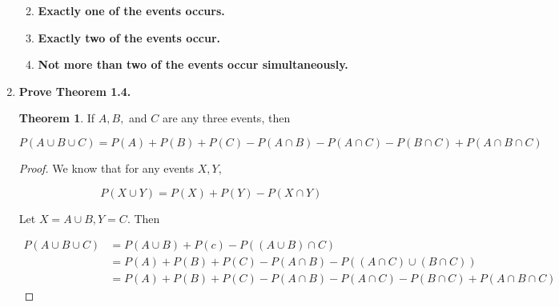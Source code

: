 \documentclass[10pt, oneside]{article}   	%
\theoremstyle{definition}
\newtheorem*{thm}{Theorem}
\begin{document}
\begin{enumerate}[label=1.\arabic*]
\begin{enumerate}
	
	\item  \begin{tcolorbox}[
	  colback=Cerulean!5!white,
	  colframe=Cerulean!75!black]
	\textbf{Exactly one of the events occurs.}
	\end{tcolorbox}
	
	
	\item  \begin{tcolorbox}[
	  colback=Cerulean!5!white,
	  colframe=Cerulean!75!black]
	\textbf{Exactly two of the events occur.}
	\end{tcolorbox}
	
	
	\item  \begin{tcolorbox}[
	  colback=Cerulean!5!white,
	  colframe=Cerulean!75!black]
	\textbf{Not more than two of the events occur simultaneously.}
	\end{tcolorbox}
	
	\end{enumerate}

\item  \begin{tcolorbox}[
  colback=Cerulean!5!white,
  colframe=Cerulean!75!black]
\textbf{Prove Theorem 1.4.}
\end{tcolorbox}

\begin{thm}
If $A, B,$ and $C$ are any three events, then

\[ P(A \cup B \cup C) = P(A) + P(B) + P(C) - P(A \cap B) - P(A \cap C) - P(B \cap C) + P(A \cap B \cap C) \]
\end{thm}

\begin{proof}
We know that for any events $X,Y$,

\[ P(X \cup Y) = P(X) + P(Y) - P(X \cap Y) \]

Let $X = A \cup B, Y = C$. Then

\begin{align*}
P(A \cup B \cup C) &= P(A \cup B) + P(c) - P((A \cup B) \cap C) \\
&= P(A) + P(B) + P(C) - P(A \cap B) - P((A \cap C) \cup (B \cap C)) \\
&= P(A) + P(B) + P(C) - P(A \cap B) - P(A \cap C) - P(B \cap C) + P(A \cap B \cap C)
\end{align*}
\end{proof}


\end{enumerate}
\end{document}
